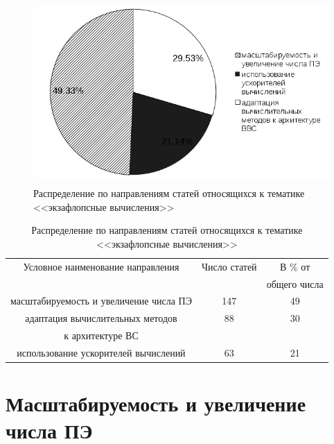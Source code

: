  	\begin{figure}[htb]
 		 \begin{center}
 		\includegraphics[height=7cm,keepaspectratio]{images/exaflops_topics_15.png}
 		\caption{Распределение по направлениям статей относящихся к тематике <<экзафлопсные вычисления>>}
 		\label{exaflops_topics_fig}
 		 \end{center}
 	\end{figure}




\begin{table}[ht]
\caption{Распределение по направлениям статей относящихся к тематике <<экзафлопсные вычисления>>}
\begin{center}
\begin{tabular}{|c|c|c|}
\hline
Условное наименование направления      & Число статей & В \%  от     \\
                                       &              & общего числа \\ \hline
масштабируемость и увеличение числа ПЭ & 147 &          49 \\  \hline
адаптация вычислительных методов       & 88  &          30  \\ 
к архитектуре ВС                       &     &              \\ \hline  
использование ускорителей вычислений   & 63  &          21 \\  \hline

\end{tabular}
\end{center}
\label{exaflops_topics_tab}
\end{table}

\section{Масштабируемость и увеличение числа ПЭ}

